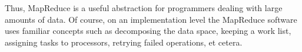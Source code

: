 Thus, MapReduce is a useful
abstraction for programmers dealing with large amounts of data.
Of course, on an implementation level the MapReduce software uses
familiar concepts such as decomposing the data space, keeping a work
list, assigning tasks to processors, retrying failed operations, et
cetera.


\endinput

\paragraph{{\bf Performance characteristics}}

MapReduce is sometimes mentioned as an alternative to databases: the
map and reduce functions can be used to form certain queries in the
data. However, MapReduce has a much higher latency than database
queries, which are typically optimized for minimum response time.

